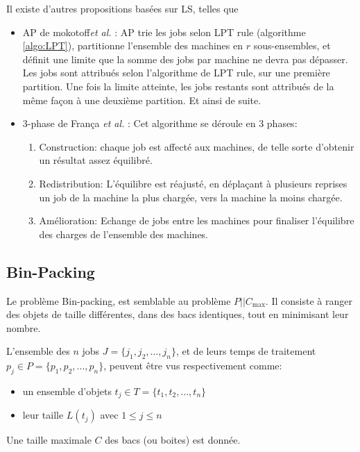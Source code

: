 \documentclass[a4paper,12pt]{report}
\theoremstyle{plain}				%
\theoremstyle{definition}				%
\newcommand\problemGrahamP{$P||C_{\max}$\xspace}
\newcommand{\lp}[1]{\todo[author=LP,color=yellow,inline]{#1}}
\newcommand{\fco}[1]{\todo[author=FCO,color=blue,inline]{#1}}
\begin{document}
Il existe d'autres propositions basées sur LS, telles que
\begin{itemize}
\item AP de mokotoff\emph{et al.} \cite{mokotoff2004exact}:
AP trie les jobs selon LPT rule (algorithme \ref{algo:LPT}),
partitionne l'ensemble des machines en $r$ sous-ensembles, et définit
une limite que la somme des jobs par machine ne devra pas dépasser.
Les jobs sont attribués selon l'algorithme de LPT rule, sur une
première partition.
Une fois la limite atteinte, les jobs restants sont attribués de la
même façon à une deuxième partition.
Et ainsi de suite.

\item 3-phase de França \emph{et al.} \cite{francca1994composite}:
  Cet algorithme se déroule en 3 phases:
  \begin{enumerate}
  \item Construction: chaque job est affecté aux machines, de telle
    sorte d'obtenir un résultat assez équilibré.
  \item Redistribution: L'équilibre est réajusté, en déplaçant à
    plusieurs reprises un job de la machine la plus chargée, vers la
    machine la moins chargée.
  \item Amélioration: Echange de jobs entre les machines pour
    finaliser l'équilibre des charges de l'ensemble des machines.
  \end{enumerate}
\end{itemize}

\lp{Dire en 2 mots ce qu'ils font?}
\fco{ok, fait}


\subsection{Bin-Packing} \label{ssec:heuristiquesBinPacking}

Le problème Bin-packing, est semblable au problème \problemGrahamP.
Il consiste à ranger des objets de taille différentes, dans des bacs
identiques, tout en minimisant leur nombre.

L'ensemble des $n$ jobs $J = \{j_1, j_2, \ldots, j_n\}$, et de leurs temps de
traitement $p_j \in P = \{p_1, p_2, ..., p_n\}$, peuvent être vus
respectivement comme:
\begin{itemize}
\item un ensemble d'objets $t_j \in T = \{t_1, t_2, ..., t_n\}$
\item leur taille $L(t_j)$ avec $1 \le j \le n$
\end{itemize}
Une taille maximale $C$ des bacs (ou boites) est donnée.
\bigskip
\end{document}
